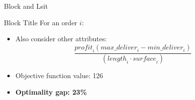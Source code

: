 \begin{frame}{Block and Lsit}
\begin{block}{Block Title}
For an order $i$:
        \begin{itemize}
            \item Also consider other attributes:
            $$\frac{\mathit{profit}_i (\mathit{max\_deliver}_i - \mathit{min\_deliver}_i)}{(\mathit{length}_i \cdot \mathit{surface}_i)}$$
        \end{itemize}
\end{block}

\begin{itemize}
        \item Objective function value: 126 
        \item \textbf{Optimality gap: 23\%} 
        \end{itemize}
\end{frame}